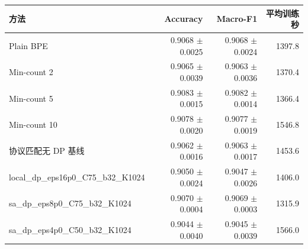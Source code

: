 \begin{tabular}{lrrr}
\toprule
方法 & Accuracy & Macro-F1 & 平均训练秒 \\
\midrule
Plain BPE & 0.9068 $\pm$ 0.0025 & 0.9068 $\pm$ 0.0024 & 1397.8 \\
Min-count 2 & 0.9065 $\pm$ 0.0039 & 0.9063 $\pm$ 0.0036 & 1370.4 \\
Min-count 5 & 0.9083 $\pm$ 0.0015 & 0.9082 $\pm$ 0.0014 & 1366.4 \\
Min-count 10 & 0.9078 $\pm$ 0.0020 & 0.9077 $\pm$ 0.0019 & 1546.8 \\
协议匹配无 DP 基线 & 0.9062 $\pm$ 0.0016 & 0.9063 $\pm$ 0.0017 & 1453.6 \\
local\_dp\_eps16p0\_C75\_b32\_K1024 & 0.9050 $\pm$ 0.0024 & 0.9047 $\pm$ 0.0026 & 1406.0 \\
sa\_dp\_eps8p0\_C75\_b32\_K1024 & 0.9070 $\pm$ 0.0004 & 0.9069 $\pm$ 0.0003 & 1315.9 \\
sa\_dp\_eps4p0\_C50\_b32\_K1024 & 0.9044 $\pm$ 0.0040 & 0.9045 $\pm$ 0.0039 & 1566.0 \\
\bottomrule
\end{tabular}
